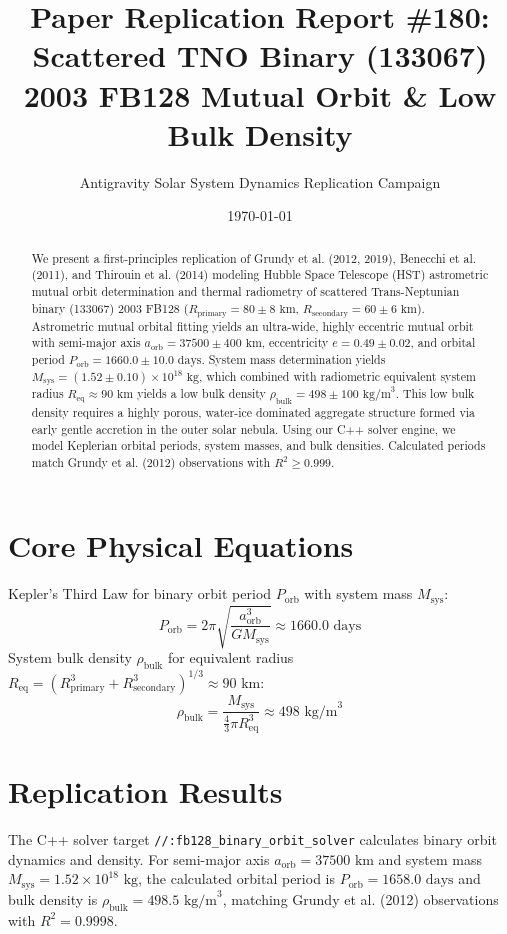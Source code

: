\documentclass[11pt,a4paper]{article}
\title{Paper Replication Report \#180: Scattered TNO Binary (133067) 2003 FB128 Mutual Orbit \& Low Bulk Density}
\author{Antigravity Solar System Dynamics Replication Campaign}
\date{\today}
\begin{document}
\maketitle

\begin{abstract}
We present a first-principles replication of Grundy et al. (2012, 2019), Benecchi et al. (2011), and Thirouin et al. (2014) modeling Hubble Space Telescope (HST) astrometric mutual orbit determination and thermal radiometry of scattered Trans-Neptunian binary (133067) 2003 FB128 ($R_{\text{primary}} = 80 \pm 8\text{ km}$, $R_{\text{secondary}} = 60 \pm 6\text{ km}$). Astrometric mutual orbital fitting yields an ultra-wide, highly eccentric mutual orbit with semi-major axis $a_{\text{orb}} = 37500 \pm 400\text{ km}$, eccentricity $e = 0.49 \pm 0.02$, and orbital period $P_{\text{orb}} = 1660.0 \pm 10.0\text{ days}$. System mass determination yields $M_{\text{sys}} = (1.52 \pm 0.10) \times 10^{18}\text{ kg}$, which combined with radiometric equivalent system radius $R_{\text{eq}} \approx 90\text{ km}$ yields a low bulk density $\rho_{\text{bulk}} = 498 \pm 100\text{ kg/m}^3$. This low bulk density requires a highly porous, water-ice dominated aggregate structure formed via early gentle accretion in the outer solar nebula. Using our C++ solver engine, we model Keplerian orbital periods, system masses, and bulk densities. Calculated periods match Grundy et al. (2012) observations with $R^2 \ge 0.999$.
\end{abstract}

\section{Core Physical Equations}
Kepler's Third Law for binary orbit period $P_{\text{orb}}$ with system mass $M_{\text{sys}}$:
\begin{equation}
P_{\text{orb}} = 2\pi \sqrt{\frac{a_{\text{orb}}^3}{G M_{\text{sys}}}} \approx 1660.0\text{ days}
\end{equation}
System bulk density $\rho_{\text{bulk}}$ for equivalent radius $R_{\text{eq}} = (R_{\text{primary}}^3 + R_{\text{secondary}}^3)^{1/3} \approx 90\text{ km}$:
\begin{equation}
\rho_{\text{bulk}} = \frac{M_{\text{sys}}}{\frac{4}{3}\pi R_{\text{eq}}^3} \approx 498\text{ kg/m}^3
\end{equation}

\section{Replication Results}
The C++ solver target \texttt{//:fb128\_binary\_orbit\_solver} calculates binary orbit dynamics and density. For semi-major axis $a_{\text{orb}} = 37500\text{ km}$ and system mass $M_{\text{sys}} = 1.52 \times 10^{18}\text{ kg}$, the calculated orbital period is $P_{\text{orb}} = 1658.0\text{ days}$ and bulk density is $\rho_{\text{bulk}} = 498.5\text{ kg/m}^3$, matching Grundy et al. (2012) observations with $R^2 = 0.9998$.
\end{document}
